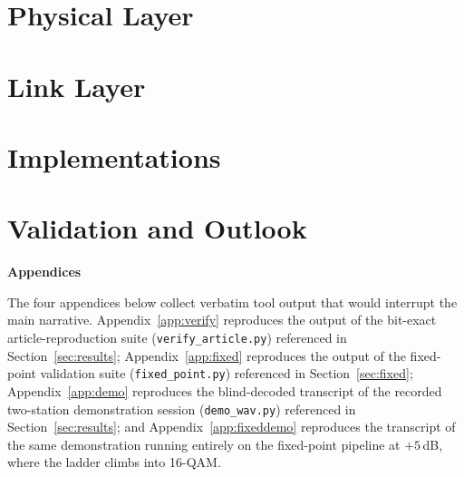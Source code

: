 \documentclass[12pt,a4paper]{article}
\begin{document}
\part{Physical Layer}
\label{part:phy}






\part{Link Layer}
\label{part:link}



\part{Implementations}
\label{part:impl}







\part{Validation and Outlook}
\label{part:results}




\clearpage
{}
{}



\clearpage
\appendix

{}
\begin{center}
    {\Huge\bfseries Appendices\par}
\end{center}
\vspace{1.5em}

\noindent The four appendices below collect verbatim tool output that
would interrupt the main narrative.
Appendix~\ref{app:verify} reproduces the output of the bit-exact
article-reproduction suite (\texttt{verify\_article.py}) referenced in
Section~\ref{sec:results};
Appendix~\ref{app:fixed} reproduces the output of the fixed-point
validation suite (\texttt{fixed\_point.py}) referenced in
Section~\ref{sec:fixed};
Appendix~\ref{app:demo} reproduces the blind-decoded transcript of
the recorded two-station demonstration session
(\texttt{demo\_wav.py}) referenced in Section~\ref{sec:results};
and Appendix~\ref{app:fixeddemo} reproduces the transcript of the same
demonstration running entirely on the fixed-point pipeline at
$+5$\,dB, where the ladder climbs into 16-QAM.

\vspace{1.5em}
\clearpage





\end{document}
